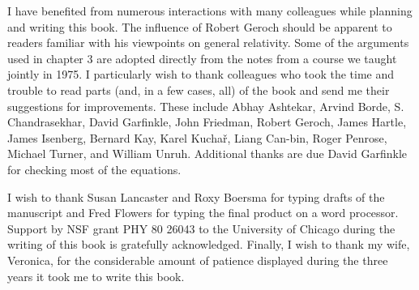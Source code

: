 I have benefited from numerous interactions with many colleagues while planning
and writing this book. The influence of Robert Geroch should be apparent to readers
familiar with his viewpoints on general relativity. Some of the arguments used in
chapter 3 are adopted directly from the notes from a course we taught jointly in
1975. I particularly wish to thank colleagues who took the time and trouble to read
parts (and, in a few cases, all) of the book and send me their suggestions for
improvements. These include Abhay Ashtekar, Arvind Borde, S. Chandrasekhar,
David Garfinkle, John Friedman, Robert Geroch, James Hartle, James Isenberg,
Bernard Kay, Karel Kucha\v{r}, Liang Can-bin, Roger Penrose, Michael Turner, and
William Unruh. Additional thanks are due David Garfinkle for checking most of the
equations.

I wish to thank Susan Lancaster and Roxy Boersma for typing drafts of the
manuscript and Fred Flowers for typing the final product on a word processor.
Support by NSF grant PHY 80 26043 to the University of Chicago during the writing
of this book is gratefully acknowledged. Finally, I wish to thank my wife,
Veronica, for the considerable amount of patience displayed during the three years
it took me to write this book.
